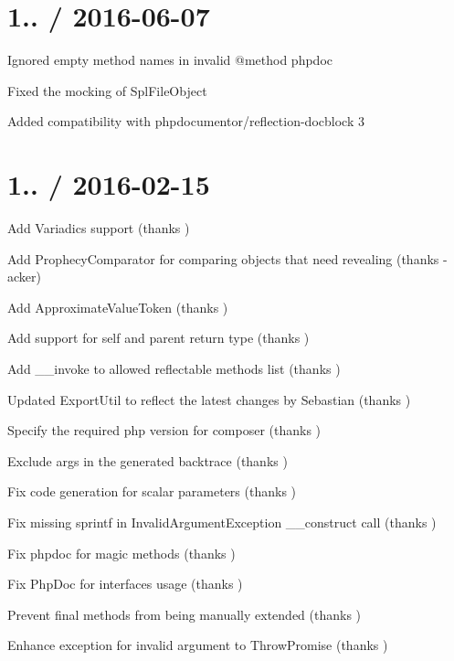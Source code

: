 \section*{1.. / 2016-\/06-\/07 }


\begin{DoxyItemize}
\item Ignored empty method names in invalid {\ttfamily @method} phpdoc
\item Fixed the mocking of Spl\+File\+Object
\item Added compatibility with phpdocumentor/reflection-\/docblock 3
\end{DoxyItemize}

\section*{1.. / 2016-\/02-\/15 }


\begin{DoxyItemize}
\item Add Variadics support (thanks )
\item Add Prophecy\+Comparator for comparing objects that need revealing (thanks -\/acker)
\item Add Approximate\+Value\+Token (thanks )
\item Add support for \textquotesingle{}self\textquotesingle{} and \textquotesingle{}parent\textquotesingle{} return type (thanks )
\item Add \+\_\+\+\_\+invoke to allowed reflectable methods list (thanks )
\item Updated Export\+Util to reflect the latest changes by Sebastian (thanks )
\item Specify the required php version for composer (thanks )
\item Exclude \textquotesingle{}args\textquotesingle{} in the generated backtrace (thanks )
\item Fix code generation for scalar parameters (thanks )
\item Fix missing sprintf in Invalid\+Argument\+Exception \+\_\+\+\_\+construct call (thanks )
\item Fix phpdoc for magic methods (thanks )
\item Fix Php\+Doc for interfaces usage (thanks )
\item Prevent final methods from being manually extended (thanks )
\item Enhance exception for invalid argument to Throw\+Promise (thanks )
\end{DoxyItemize}

